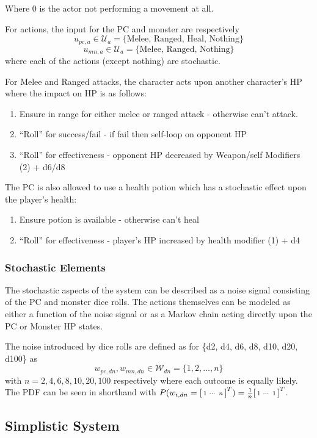\documentclass[letterpaper, 10 pt, conference]{ieeeconf}
\begin{document}
Where \(0\) is the actor not performing a movement at all.

For actions, the input for the PC and monster are respectively \[
    u_{pc,a} \in \mathcal{U}_{a} = \{\text{Melee, Ranged, Heal, Nothing}\}\]
    \[u_{mn,a} \in \mathcal{U}_{a} = \{\text{Melee, Ranged, Nothing}\}
\] where each of the actions (except nothing) are stochastic.

For Melee and Ranged attacks, the character acts upon another character's HP where the impact on HP is as follows:
\begin{enumerate}
    \item Ensure in range for either melee or ranged attack - otherwise can't attack.
    \item ``Roll'' for success/fail - if fail then self-loop on opponent HP
    \item ``Roll'' for effectiveness - opponent HP decreased by Weapon/self Modifiers (2) + d6/d8
\end{enumerate}

The PC is also allowed to use a health potion which has a stochastic effect upon the player's health:
\begin{enumerate}
    \item Ensure potion is available - otherwise can't heal
    \item ``Roll'' for effectiveness - player's HP increased by health modifier (1) + d4
\end{enumerate}

\subsubsection{Stochastic Elements}
The stochastic aspects of the system can be described as a noise signal consisting of the PC and monster dice rolls.
The actions themselves can be modeled as either a function of the noise signal or as a Markov chain acting directly upon the PC or Monster HP states.

The noise introduced by dice rolls are defined as for \{d2, d4, d6, d8, d10, d20, d100\} as 
\[
    w_{pc,dn}, w_{mn,dn} \in \mathcal{W}_{dn} = \{1,2,\dots,n\}
\] with $n = 2,4,6,8,10,20,100$ respectively where each outcome is equally likely.
The PDF can be seen in shorthand with $P(w_{i,dn} = \smqty[1 & \cdots & n]^T) = \frac{1}{n}\smqty[1 & \cdots & 1]^T$.
% 
\subsection{Simplistic System}
\end{document}

